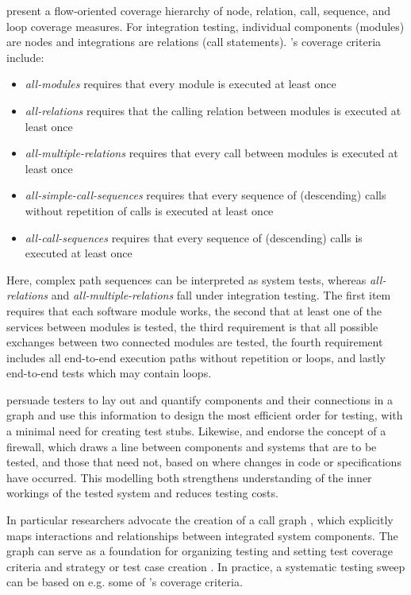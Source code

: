 \documentclass[12pt,a4paper,oneside,pdftex]{report}
\begin{document}
\citet{linnenkugel1990test} present a flow-oriented coverage hierarchy of node, relation, call, sequence, and loop coverage measures. For integration testing, individual components (modules) are nodes and integrations are relations (call statements). \citeauthor{linnenkugel1990test}'s \citeyearpar{linnenkugel1990test} coverage criteria include:
\begin{itemize}
\item \emph{all-modules} requires that every module is executed at least once 
\item \emph{all-relations} requires that the calling relation between modules is executed at least once
\item \emph{all-multiple-relations} requires that every call between modules is executed at least once
\item \emph{all-simple-call-sequences} requires that every sequence of (descending) calls without repetition of calls is executed at least once
\item \emph{all-call-sequences} requires that every sequence of (descending) calls is executed at least once
\end{itemize}
Here, complex path sequences can be interpreted as system tests, whereas \emph{all-relations} and \emph{all-multiple-relations} fall under integration testing. The first item requires that each software module works, the second that at least one of the services between modules is tested, the third requirement is that all possible exchanges between two connected modules are tested, the fourth requirement includes all end-to-end execution paths without repetition or loops, and lastly end-to-end tests which may contain loops.

\citet{hewett2009automated} persuade testers to lay out and quantify components and their connections in a graph and use this information to design the most efficient order for testing, with a minimal need for creating test stubs. Likewise, \citet{leung1990study} and \citet{abdullah1995correcting} endorse the concept of a firewall, which draws a line between components and systems that are to be tested, and those that need not, based on where changes in code or specifications have occurred. This modelling both strengthens understanding of the inner workings of the tested system and reduces testing costs.

In particular researchers advocate the creation of a call graph \citep{leung1990study, hurlburt2012not, linnenkugel1990test}, which explicitly maps interactions and relationships between integrated system components. The graph can serve as a foundation for organizing testing and setting test coverage criteria and strategy or test case creation \citep{benz2007combining, hura2011method, linnenkugel1990test}. In practice, a systematic testing sweep can be based on e.g. some of \citeauthor{linnenkugel1990test}'s \citeyearpar{linnenkugel1990test} coverage criteria. 
\end{document}
